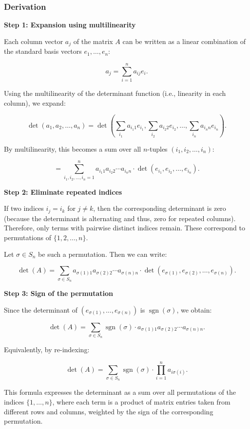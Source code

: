 \subsubsection{Derivation}

\textbf{Step 1: Expansion using multilinearity}

Each column vector \( a_j \) of the matrix \(A\) can be written as a linear combination of the standard basis vectors \( e_1, \dots, e_n \):

\[
    a_j = \sum_{i=1}^n a_{ij} e_i.
\]

Using the multilinearity of the determinant function (i.e., linearity in each column), we expand:

\[
    \det(a_1, a_2, \dots, a_n) = \det\left( \sum_{i_1} a_{i_1 1} e_{i_1}, \sum_{i_2} a_{i_2 2} e_{i_2}, \dots, \sum_{i_n} a_{i_n n} e_{i_n} \right).
\]

By multilinearity, this becomes a sum over all \(n\)-tuples \( (i_1, i_2, \dots, i_n) \):

\[
    = \sum_{i_1, i_2, \dots, i_n = 1}^n a_{i_1 1} a_{i_2 2} \cdots a_{i_n n} \cdot \det(e_{i_1}, e_{i_2}, \dots, e_{i_n}).
\]

\textbf{Step 2: Eliminate repeated indices}

If two indices \( i_j = i_k \) for \( j \neq k \), then the corresponding 
determinant is zero (because the determinant is alternating and thus, zero for repeated columns). 
Therefore, only terms with pairwise distinct indices remain. These correspond to permutations of \( \{1, 2, \dots, n\} \).

Let \( \sigma \in S_n \) be such a permutation. Then we can write:

\[
    \det(A) = \sum_{\sigma \in S_n} a_{\sigma(1) 1} a_{\sigma(2) 2} \cdots a_{\sigma(n) n} \cdot \det(e_{\sigma(1)}, e_{\sigma(2)}, \dots, e_{\sigma(n)}).
\]

\textbf{Step 3: Sign of the permutation}

Since the determinant of \( (e_{\sigma(1)}, \dots, e_{\sigma(n)}) \) is \( \operatorname{sgn}(\sigma) \), we obtain:

\[
    \det(A) = \sum_{\sigma \in S_n} \operatorname{sgn}(\sigma) \cdot a_{\sigma(1)1} a_{\sigma(2)2} \cdots a_{\sigma(n)n}.
\]

Equivalently, by re-indexing:

\[
    \det(A) = \sum_{\sigma \in S_n} \operatorname{sgn}(\sigma) \cdot \prod_{i=1}^n a_{i \sigma(i)}.
\]

This formula expresses the determinant as a sum over all permutations of the indices \( \{1, \dots, n\} \), where each term is a product of matrix entries taken from different rows and columns, weighted by the sign of the corresponding permutation.

